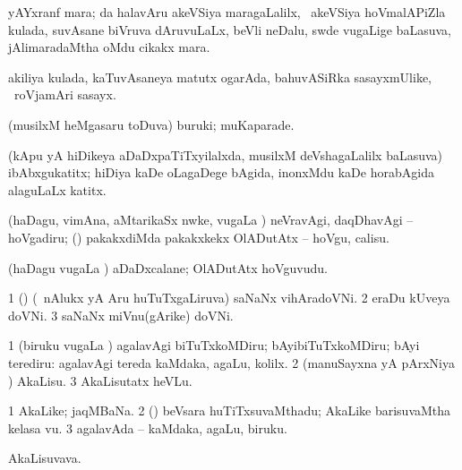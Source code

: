 \bentry
{} 
\gl{\nA} 
\bmng
yAYxranf mara; \AseTxrXV da halavAru akeVSiya maragaLalilx, \kanmu\ akeVSiya hoVmalAPiZla kulada, suvAsane biVruva dAruvuLaLx, beVli neDalu, swde \mo vugaLige baLasuva, jAlimaradaMtha oMdu cikakx mara.
\emng
\eentry

\bentry
{} 
\gl{\nA} 
\bmng
akiliya kulada, kaTuvAsaneya matutx ogarAda, bahuvASiRka sasayxmUlike, \kanmu\ roVjamAri sasayx.
\emng
\eentry

\bentry
{} 
\gl{\nA} 
\bmng
(musilxM heMgasaru toDuva) buruki; muKaparade.
\emng 
\eentry

\bentry
{} 
\gl{\nA}
\bmng
(kApu yA hiDikeya aDaDxpaTiTxyilalxda, musilxM deVshagaLalilx baLasuva) ibAbxgukatitx; hiDiya kaDe oLagaDege bAgida, inonxMdu kaDe horabAgida alaguLaLx katitx. 
\emng
\eentry

\bentry
{} 
\gl{\akirx} 
\bmng
(haDagu, vimAna, aMtarikaSx nwke, \mo vugaLa \vi) neVravAgi, daqDhavAgi -- hoVgadiru; (\kanmu) pakakxdiMda pakakxkekx OlADutAtx -- hoVgu, calisu.
\emng
\eentry

\bentry
{} 
\gl{\nA}
\bmng
(haDagu \mo vugaLa \vi) aDaDxcalane; OlADutAtx hoVguvudu.
\emng 
\eentry

\bentry
{} 
\gl{\nA}
\bmng
\bnum
\num{1} (\ca) (\kanmu\ nAlukx yA Aru huTuTxgaLiruva) saNaNx vihAradoVNi.
\num{2} eraDu kUveya doVNi. 
\num{3} saNaNx miVnu(gArike) doVNi. 
\enum
\emng
\eentry

\bentry
{}  
\gl{\akirx}
\bmng
\bnum
\num{1} (biruku \mo vugaLa \vi) agalavAgi biTuTxkoMDiru; bAyibiTuTxkoMDiru; bAyi terediru:   agalavAgi tereda kaMdaka, agaLu, kolilx. 
\num{2} (manuSayxna yA pArxNiya \vi) AkaLisu. 
\num{3} AkaLisutatx heVLu.
\enum
\emng
\eentry

\bentry
{} 
\gl{\nA} 
\bmng
\bnum
\num{1} AkaLike; jaqMBaNa. 
\num{2} (\AmA) beVsara huTiTxsuvaMthadu; AkaLike barisuvaMtha kelasa \mo vu. 
\num{3} agalavAda -- kaMdaka, agaLu, biruku.
\enum
\emng 
\eentry

\bentry
{} 
\gl{\nA} 
\bmng
AkaLisuvava.
\emng
\eentry

